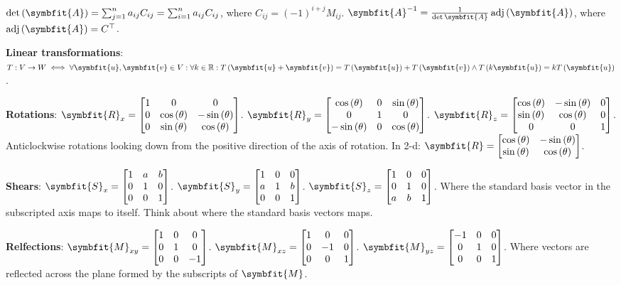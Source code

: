 \documentclass{article}
\begin{document}
\noindent $\det{\left( \symbfit{A} \right)} = \sum_{j=1}^n a_{ij}C_{ij} = \sum_{i=1}^n a_{ij}C_{ij}$, where $C_{ij}=\left( -1 \right)^{i+j}M_{ij}$. $\symbfit{A}^{-1}=\frac{1}{\det{\symbfit{A}}} \adj{\left( \symbfit{A} \right)}$, where $\adj{\left( \symbfit{A} \right)}=C^\top$.

\noindent \textbf{Linear transformations}: $T:V\rightarrow W \iff \forall \symbfit{u}, \symbfit{v} \in V:\forall k \in \mathbb{R}:\func{T}{\symbfit{u}+\symbfit{v}}=\func{T}{\symbfit{u}} + \func{T}{\symbfit{v}} \wedge \func{T}{k\symbfit{u}} = k\func{T}{\symbfit{u}}$. 

\noindent \textbf{Rotations}: $\symbfit{R}_x=\mqty[1 & 0 & 0 \\ 0 & \cos{\left( \theta \right)} & -\sin{\left( \theta \right)} \\ 0 & \sin{\left( \theta \right)} & \cos{\left( \theta \right)}]$. $\symbfit{R}_y=\mqty[\cos{\left( \theta \right)} & 0 & \sin{\left( \theta \right)} \\ 0 & 1 & 0 \\ -\sin{\left( \theta \right)} & 0 & \cos{\left( \theta \right)}]$. $\symbfit{R}_z=\mqty[\cos{\left( \theta \right)} & -\sin{\left( \theta \right)} & 0 \\ \sin{\left( \theta \right)} & \cos{\left( \theta \right)} & 0 \\ 0 & 0 & 1]$. Anticlockwise rotations looking down from the positive direction of the axis of rotation.
In 2-d: $\symbfit{R}=\mqty[\cos{\left( \theta \right)} & -\sin{\left( \theta \right)} \\ \sin{\left( \theta \right)} & \cos{\left( \theta \right)}]$.
		
\noindent \textbf{Shears}: $\symbfit{S}_x=\mqty[1 & a & b \\ 0 & 1 & 0 \\ 0 & 0 & 1]$. $\symbfit{S}_y=\mqty[1 & 0 & 0 \\ a & 1 & b \\ 0 & 0 & 1]$. $\symbfit{S}_z=\mqty[1 & 0 & 0 \\ 0 & 1 & 0 \\ a & b & 1]$. Where the standard basis vector in the subscripted axis maps to itself. Think about where the standard basis vectors maps.

\noindent \textbf{Relfections}: $\symbfit{M}_{xy}=\mqty[1 & 0 & 0 \\ 0 & 1 & 0 \\ 0 & 0 & -1]$. $\symbfit{M}_{xz}=\mqty[1 & 0 & 0 \\ 0 & -1 & 0 \\ 0 & 0 & 1]$. $\symbfit{M}_{yz}=\mqty[-1 & 0 & 0 \\ 0 & 1 & 0 \\ 0 & 0 & 1]$. Where vectors are reflected across the plane formed by the subscripts of $\symbfit{M}$.
\end{document}
